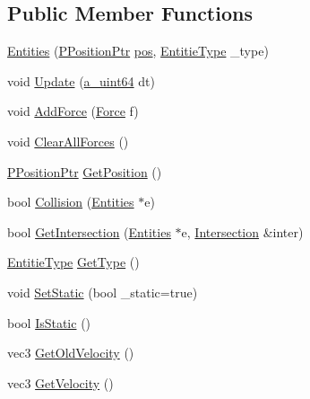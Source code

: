 \subsection*{Public Member Functions}
\begin{DoxyCompactItemize}
\item 
\hyperlink{class_agmd_physics_1_1_entities_ae06dde45e630ed18d2976696e8c98439}{Entities} (\hyperlink{namespace_agmd_physics_a72f849383bbb96be02fec5a53333d7fd}{P\+Position\+Ptr} \hyperlink{_examples_2_planet_2_app_8cpp_aa8a1c0491559faca4ebd0881575ae7f0}{pos}, \hyperlink{namespace_agmd_physics_ad084e24011be0a7009fedc9ed9ee92ed}{Entitie\+Type} \+\_\+type)
\item 
void \hyperlink{class_agmd_physics_1_1_entities_a325d324b384129d56416d8d4b2ccbef3}{Update} (\hyperlink{_common_defines_8h_a6c5192ec3c55d6e5b13d2dbaa082bdea}{a\+\_\+uint64} dt)
\item 
void \hyperlink{class_agmd_physics_1_1_entities_ade37092eac084d2cc8a9eb3fd8881f70}{Add\+Force} (\hyperlink{class_agmd_physics_1_1_force}{Force} f)
\item 
void \hyperlink{class_agmd_physics_1_1_entities_a0e6a72afc89f6e72961c0014ded4e34d}{Clear\+All\+Forces} ()
\item 
\hyperlink{namespace_agmd_physics_a72f849383bbb96be02fec5a53333d7fd}{P\+Position\+Ptr} \hyperlink{class_agmd_physics_1_1_entities_a95feafafef661cb1c7811004d0da1284}{Get\+Position} ()
\item 
bool \hyperlink{class_agmd_physics_1_1_entities_a0b8b039fb6f13dd66a17d146fa4baf97}{Collision} (\hyperlink{class_agmd_physics_1_1_entities}{Entities} $\ast$e)
\item 
bool \hyperlink{class_agmd_physics_1_1_entities_a0076c27b9ef6f90c8de917c0f3cc1189}{Get\+Intersection} (\hyperlink{class_agmd_physics_1_1_entities}{Entities} $\ast$e, \hyperlink{struct_agmd_physics_1_1_intersection}{Intersection} \&inter)
\item 
\hyperlink{namespace_agmd_physics_ad084e24011be0a7009fedc9ed9ee92ed}{Entitie\+Type} \hyperlink{class_agmd_physics_1_1_entities_a7e99e93cf6c3f1f915e186f8d2ca4ab8}{Get\+Type} ()
\item 
void \hyperlink{class_agmd_physics_1_1_entities_a65e43c1e569e831c2ebcefe1791a52c6}{Set\+Static} (bool \+\_\+static=true)
\item 
bool \hyperlink{class_agmd_physics_1_1_entities_a7e2166d5442e065000757f4c6a0f10cf}{Is\+Static} ()
\item 
vec3 \hyperlink{class_agmd_physics_1_1_entities_afc5fac5ee33c6356a73de2f253ef6a18}{Get\+Old\+Velocity} ()
\item 
vec3 \hyperlink{class_agmd_physics_1_1_entities_a625d621c72737e046b44941164922b43}{Get\+Velocity} ()
\end{DoxyCompactItemize}
